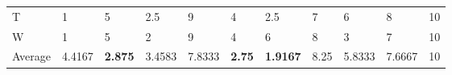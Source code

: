 \documentclass[11pt, a4paper]{article}
\begin{document}
\begin{table}[H]
\begin{tabular}{lllllllllll}
T                              & 1                                        & 5                                & 2.5                              & 9                                  & 4                                 & 2.5                             & 7                                 & 6                                   & 8                                   & 10                                  \\
W                             & 1                                        & 5                                & 2                                & 9                                  & 4                                 & 6                               & 8                                 & 3                                   & 7                                   & 10                                  \\ \hline
Average                               & 4.4167                                   & \textbf{2.875}                   & 3.4583                           & 7.8333                             & \textbf{2.75}                     & \textbf{1.9167}                 & 8.25                              & 5.8333                              & 7.6667                              & 10
\end{tabular}
\end{table}
\end{document}
